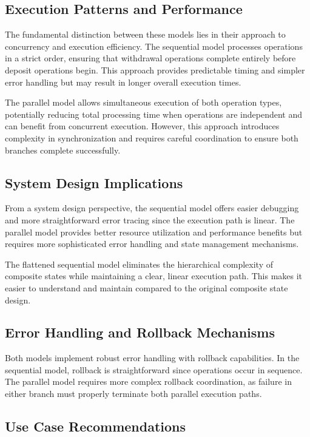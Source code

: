 \documentclass[a4paper,12pt]{article}
\begin{document}
\subsection*{Execution Patterns and Performance}

The fundamental distinction between these models lies in their approach to concurrency and execution efficiency. The sequential model processes operations in a strict order, ensuring that withdrawal operations complete entirely before deposit operations begin. This approach provides predictable timing and simpler error handling but may result in longer overall execution times.

The parallel model allows simultaneous execution of both operation types, potentially reducing total processing time when operations are independent and can benefit from concurrent execution. However, this approach introduces complexity in synchronization and requires careful coordination to ensure both branches complete successfully.

\subsection*{System Design Implications}

From a system design perspective, the sequential model offers easier debugging and more straightforward error tracing since the execution path is linear. The parallel model provides better resource utilization and performance benefits but requires more sophisticated error handling and state management mechanisms.

The flattened sequential model eliminates the hierarchical complexity of composite states while maintaining a clear, linear execution path. This makes it easier to understand and maintain compared to the original composite state design.

\subsection*{Error Handling and Rollback Mechanisms}

Both models implement robust error handling with rollback capabilities. In the sequential model, rollback is straightforward since operations occur in sequence. The parallel model requires more complex rollback coordination, as failure in either branch must properly terminate both parallel execution paths.

\subsection*{Use Case Recommendations}
\end{document}

